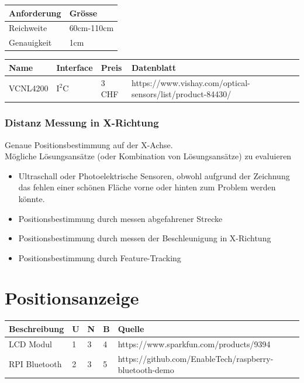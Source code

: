 \documentclass[a4paper]{report}
\begin{document}
\vspace{1em}
\noindent
\begin{tabular}{|p{}|p{}|}
  \hline
  \textbf{Anforderung} & \textbf{Grösse} \\
  \hline
  Reichweite & 60cm-110cm \\
  \hline
  Genauigkeit & 1cm \\
  \hline
\end{tabular}

\vspace{1em}
\noindent
\begin{tabular}{|p{}|p{}|p{}|p{}|}
  \hline
  \textbf{Name} & \textbf{Interface} & \textbf{Preis} & \textbf{Datenblatt} \\
  \hline
  VCNL4200 & $\text{I}^2\text{C}$ & 3 CHF & https://www.vishay.com/optical-sensors/list/product-84430/ \\
  \hline
\end{tabular}

\subsubsection{Distanz Messung in X-Richtung}
Genaue Positionsbestimmung auf der X-Achse.\\
Mögliche Lösungsansätze (oder Kombination von Lösungsansätze) zu
evaluieren
\begin{itemize}
\item Ultraschall oder Photoelektrische Sensoren, obwohl aufgrund der Zeichnung
  das fehlen einer schönen Fläche vorne oder hinten zum Problem werden könnte.
\item Positionsbestimmung durch messen abgefahrener Strecke
\item Positionsbestimmung durch messen der Beschleunigung in X-Richtung
\item Positionsbestimmung durch Feature-Tracking
\end{itemize}

\section{Positionsanzeige}
\vspace{1em}
\noindent
\begin{tabular}{|p{}|p{}|p{}|p{}|p{}|}
	\hline
	\textbf{Beschreibung} & \textbf{U} & \textbf{N} & \textbf{B} & \textbf{Quelle} \\
	\hline
	LCD Modul & 1 & 3 & 4 & https://www.sparkfun.com/products/9394 \\
	\hline
	RPI Bluetooth & 2 & 3 & 5 & https://github.com/EnableTech/raspberry-bluetooth-demo \\
	\hline
\end{tabular}
\end{document}
